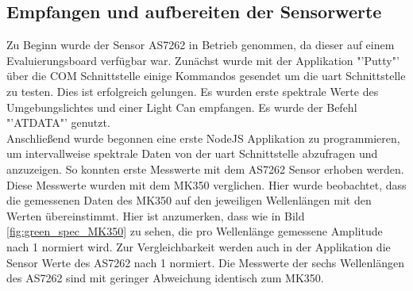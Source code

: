 \documentclass[11pt]{scrartcl}
\begin{document}
\subsection{Empfangen und aufbereiten der Sensorwerte}
Zu Beginn wurde der Sensor AS7262 in Betrieb genommen, da dieser auf einem Evaluierungsboard verfügbar war.
Zunächst wurde mit der Applikation "'Putty"' über die COM Schnittstelle einige Kommandos gesendet um die
\ac{uart} Schnittstelle zu testen. Dies ist erfolgreich gelungen. Es wurden erste spektrale Werte des
Umgebungslichtes und einer Light Can empfangen. Es wurde der Befehl "'ATDATA"' genutzt.\\
Anschließend wurde begonnen eine erste NodeJS Applikation zu programmieren, um intervallweise spektrale Daten
von der \ac{uart} Schnittstelle abzufragen und anzuzeigen. So konnten erste Messwerte mit dem AS7262 Sensor erhoben werden.
Diese Messwerte wurden mit dem MK350 verglichen. Hier wurde beobachtet, dass die gemessenen Daten des MK350 auf den jeweiligen
Wellenlängen mit den Werten übereinstimmt. Hier ist anzumerken, dass wie in Bild \ref{fig:green_spec_MK350} zu sehen, die pro Wellenlänge
gemessene Amplitude nach 1 normiert wird. Zur Vergleichbarkeit werden auch in der Applikation die Sensor Werte des AS7262 nach
1 normiert. Die Messwerte der sechs Wellenlängen des AS7262 sind mit geringer Abweichung identisch zum MK350.\\
\end{document}
